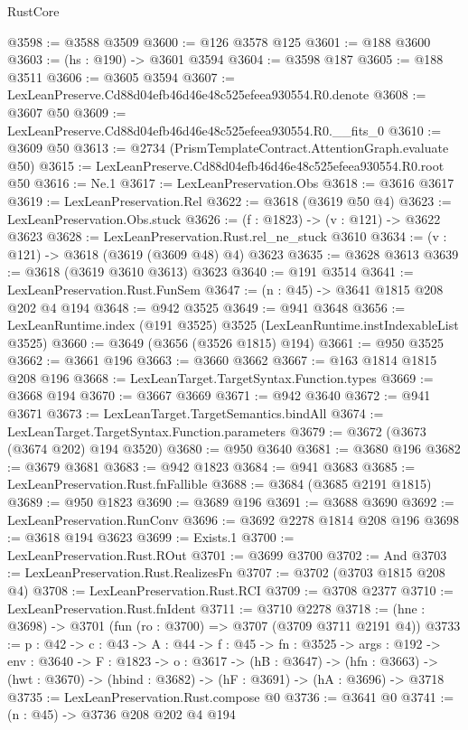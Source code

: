 \begin{lexlean}{RustCore}
\begin{coremodule}
@3598 := @3588 @3509
@3600 := @126 @3578 @125
@3601 := @188 @3600
@3603 := (hs : @190) -> @3601 @3594
@3604 := @3598 @187
@3605 := @188 @3511
@3606 := @3605 @3594
@3607 := LexLeanPreserve.Cd88d04efb46d46e48c525efeea930554.R0.denote
@3608 := @3607 @50
@3609 := LexLeanPreserve.Cd88d04efb46d46e48c525efeea930554.R0.__fits_0
@3610 := @3609 @50
@3613 := @2734 (PrismTemplateContract.AttentionGraph.evaluate @50)
@3615 := LexLeanPreserve.Cd88d04efb46d46e48c525efeea930554.R0.root @50
@3616 := Ne.{1}
@3617 := LexLeanPreservation.Obs
@3618 := @3616 @3617
@3619 := LexLeanPreservation.Rel
@3622 := @3618 (@3619 @50 @4)
@3623 := LexLeanPreservation.Obs.stuck
@3626 := (f : @1823) -> (v : @121) -> @3622 @3623
@3628 := LexLeanPreservation.Rust.rel_ne_stuck @3610
@3634 := (v : @121) -> @3618 (@3619 (@3609 @48) @4) @3623
@3635 := @3628 @3613
@3639 := @3618 (@3619 @3610 @3613) @3623
@3640 := @191 @3514
@3641 := LexLeanPreservation.Rust.FunSem
@3647 := (n : @45) -> @3641 @1815 @208 @202 @4 @194
@3648 := @942 @3525
@3649 := @941 @3648
@3656 := LexLeanRuntime.index (@191 @3525) @3525 (LexLeanRuntime.instIndexableList @3525)
@3660 := @3649 (@3656 (@3526 @1815) @194)
@3661 := @950 @3525
@3662 := @3661 @196
@3663 := @3660 @3662
@3667 := @163 @1814 @1815 @208 @196
@3668 := LexLeanTarget.TargetSyntax.Function.types
@3669 := @3668 @194
@3670 := @3667 @3669
@3671 := @942 @3640
@3672 := @941 @3671
@3673 := LexLeanTarget.TargetSemantics.bindAll
@3674 := LexLeanTarget.TargetSyntax.Function.parameters
@3679 := @3672 (@3673 (@3674 @202) @194 @3520)
@3680 := @950 @3640
@3681 := @3680 @196
@3682 := @3679 @3681
@3683 := @942 @1823
@3684 := @941 @3683
@3685 := LexLeanPreservation.Rust.fnFallible
@3688 := @3684 (@3685 @2191 @1815)
@3689 := @950 @1823
@3690 := @3689 @196
@3691 := @3688 @3690
@3692 := LexLeanPreservation.RunConv
@3696 := @3692 @2278 @1814 @208 @196
@3698 := @3618 @194 @3623
@3699 := Exists.{1}
@3700 := LexLeanPreservation.Rust.ROut
@3701 := @3699 @3700
@3702 := And
@3703 := LexLeanPreservation.Rust.RealizesFn
@3707 := @3702 (@3703 @1815 @208 @4)
@3708 := LexLeanPreservation.Rust.RCI
@3709 := @3708 @2377
@3710 := LexLeanPreservation.Rust.fnIdent
@3711 := @3710 @2278
@3718 := (hne : @3698) -> @3701 (fun (ro : @3700) => @3707 (@3709 @3711 @2191 @4))
@3733 := {p : @42} ->
  {c : @43} ->
  {A : @44} ->
  {f : @45} ->
  {fn : @3525} ->
  {args : @192} ->
  {env : @3640} ->
  {F : @1823} ->
  {o : @3617} ->
  (hB : @3647) ->
  (hfn : @3663) -> (hwt : @3670) -> (hbind : @3682) -> (hF : @3691) -> (hA : @3696) -> @3718
@3735 := LexLeanPreservation.Rust.compose @0
@3736 := @3641 @0
@3741 := (n : @45) -> @3736 @208 @202 @4 @194

\end{coremodule}
\end{lexlean}
